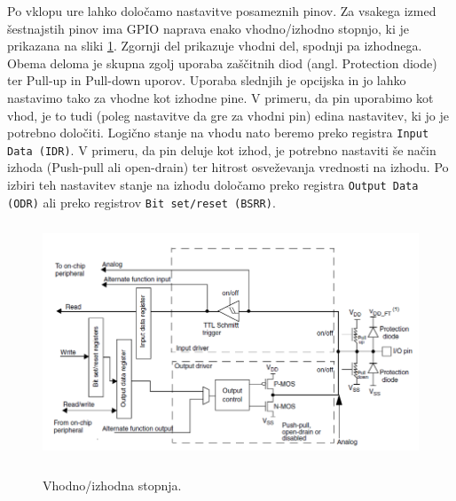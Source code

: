 \documentclass[12pt,letterpaper]{article}
\begin{document}
Po vklopu ure lahko določamo nastavitve posameznih pinov. Za vsakega izmed šestnajstih pinov ima GPIO naprava enako vhodno/izhodno stopnjo, ki je prikazana na sliki \ref{vhodno_izhodna_stopnja}. Zgornji del prikazuje vhodni del, spodnji pa izhodnega. Obema deloma je skupna zgolj uporaba zaščitnih diod (angl. Protection diode) ter Pull-up in Pull-down uporov. Uporaba slednjih je opcijska in jo lahko nastavimo tako za vhodne kot izhodne pine. V primeru, da pin uporabimo kot vhod, je to tudi (poleg nastavitve da gre za vhodni pin) edina nastavitev, ki jo je potrebno določiti. Logično stanje na vhodu nato beremo preko registra \texttt{Input Data (IDR)}.
V primeru, da pin deluje kot izhod, je potrebno nastaviti še način izhoda (Push-pull ali open-drain) ter hitrost osveževanja vrednosti na izhodu. Po izbiri teh nastavitev stanje na izhodu določamo preko registra \texttt{Output Data (ODR)} ali preko registrov \texttt{Bit set/reset (BSRR)}.

\begin{figure}[ht!]
  \centering
  \caption{Vhodno/izhodna stopnja.}
  \includegraphics[height=200pt]{images/vaja3/vhodno_izhodna_stopnja.png}
  \label{vhodno_izhodna_stopnja}
\end{figure}
\end{document}
